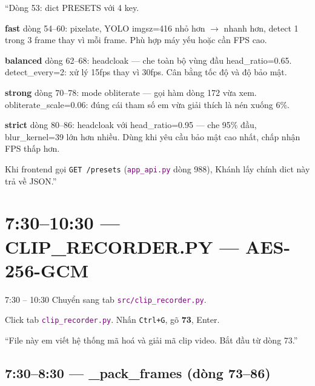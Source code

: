 \documentclass[12pt, a4paper]{article}
\newcommand{\fpath}[1]{\texttt{\textcolor{purple}{#1}}}
\begin{document}
\begin{say}
``Dòng 53: dict PRESETS với 4 key.

\textbf{fast} dòng 54--60: pixelate, YOLO imgsz=416 nhỏ hơn $\to$ nhanh hơn,
detect 1 trong 3 frame thay vì mỗi frame.
Phù hợp máy yếu hoặc cần FPS cao.

\textbf{balanced} dòng 62--68: headcloak --- che toàn bộ vùng đầu head\_ratio=0.65.
detect\_every=2: xử lý 15fps thay vì 30fps.
Cân bằng tốc độ và độ bảo mật.

\textbf{strong} dòng 70--78: mode obliterate --- gọi hàm dòng 172 vừa xem.
obliterate\_scale=0.06: đúng cái tham số em vừa giải thích là nén xuống 6\%.

\textbf{strict} dòng 80--86: headcloak với head\_ratio=0.95 --- che 95\% đầu,
blur\_kernel=39 lớn hơn nhiều.
Dùng khi yêu cầu bảo mật cao nhất, chấp nhận FPS thấp hơn.

Khi frontend gọi \texttt{GET /presets} (\fpath{app\_api.py} dòng 988),
Khánh lấy chính dict này trả về JSON.''
\end{say}

\section{7:30--10:30 --- CLIP\_RECORDER.PY --- AES-256-GCM}

\begin{timing}{7:30 -- 10:30}
Chuyển sang tab \fpath{src/clip\_recorder.py}.
\end{timing}

\begin{doact}
Click tab \fpath{clip\_recorder.py}.
Nhấn \texttt{Ctrl+G}, gõ \textbf{73}, Enter.
\end{doact}

\begin{say}
``File này em viết hệ thống mã hoá và giải mã clip video.
Bắt đầu từ dòng 73.''
\end{say}

\subsection{7:30--8:30 --- \_pack\_frames (dòng 73--86)}
\end{document}

